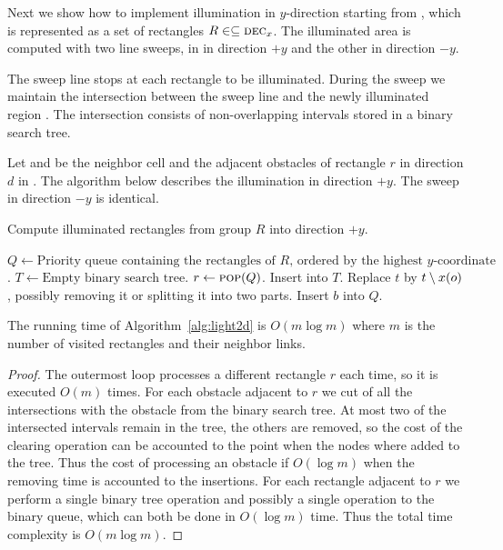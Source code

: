 \documentclass[english,gradu]{tktltiki2018}
\begin{document}
Next we show how to implement illumination in $y$-direction starting from , which is represented as a set of rectangles $R\in\subseteq\textsc{dec}_{x}$.
The illuminated area is computed with two line sweeps, in in direction $+y$ and the other in direction $-y$.

The sweep line stops at each rectangle to be illuminated.
During the sweep we maintain the intersection between the sweep line and the newly illuminated region .
The intersection consists of non-overlapping intervals stored in a binary search tree.

Let  and  be the neighbor cell and the adjacent obstacles of rectangle $r$ in direction $d$ in .
The algorithm below describes the illumination in direction $+y$.
The sweep in direction $-y$ is identical.

\begin{alg}\label{alg:light2d}
Compute illuminated rectangles from group $R$ into direction $+y$.
\begin{algorithmic}
\State $Q\gets\text{Priority queue containing the rectangles of $R$, ordered by the highest $y$-coordinate}$.
\State $T\gets\text{Empty binary search tree}$.
	\State $r\gets\textsc{pop}(Q)$.
		\State Insert  into $T$.
	\EndIf
			\State Replace $t$ by $t\setminus x(o)$, possibly removing it or splitting it into two parts.
		\EndFor
	\EndFor
			\State Insert $b$ into $Q$.
		\EndIf
	\EndFor
\EndWhile
\end{algorithmic}
\end{alg}

\begin{lem}\label{lem:light2dtime}The running time of Algorithm~\ref{alg:light2d} is $O(m\log m)$ where $m$ is the number of visited rectangles and their neighbor links.\end{lem}
\begin{proof}
The outermost loop processes a different rectangle $r$ each time, so it is executed $O(m)$ times.
For each obstacle adjacent to $r$ we cut of all the intersections with the obstacle from the binary search tree.
At most two of the intersected intervals remain in the tree, the others are removed, so the cost of the clearing operation can be accounted to the point when the nodes where added to the tree.
Thus the cost of processing an obstacle if $O(\log m)$ when the removing time is accounted to the insertions.
For each rectangle adjacent to $r$ we perform a single binary tree operation and possibly a single operation to the binary queue, which can both be done in $O(\log m)$ time.
Thus the total time complexity is $O(m\log m)$.
\end{proof}
\end{document}
